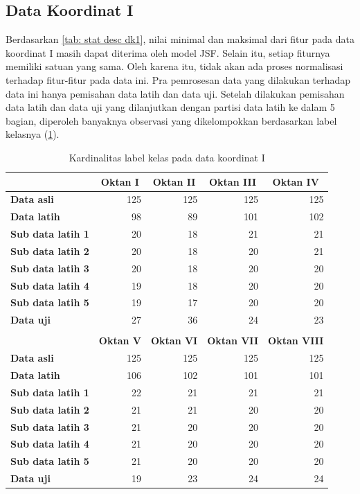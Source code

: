 \subsection{Data Koordinat I}
\noindent Berdasarkan \ref{tab: stat desc dk1}, nilai minimal dan maksimal dari fitur pada data koordinat I masih dapat diterima oleh model JSF. Selain itu, setiap fiturnya memiliki satuan yang sama. Oleh karena itu, tidak akan ada proses normalisasi terhadap fitur-fitur pada data ini. Pra pemrosesan data yang dilakukan terhadap data ini hanya pemisahan data latih dan data uji. Setelah dilakukan pemisahan data latih dan data uji yang dilanjutkan dengan partisi data latih ke dalam 5 bagian, diperoleh banyaknya observasi yang dikelompokkan berdasarkan label kelasnya (\ref{tab: label kelas dk1}).

\begin{table}[h!]
  \centering
  \caption{Kardinalitas label kelas pada data koordinat I}
    \begin{tabular}{lrrrr}
    \toprule
          & \multicolumn{1}{c}{\textbf{Oktan I}} & \multicolumn{1}{c}{\textbf{Oktan II}} & \multicolumn{1}{c}{\textbf{Oktan III}} & \multicolumn{1}{c}{\textbf{Oktan IV}} \\
    \midrule
    \textbf{Data asli} & 125   & 125   & 125   & 125 \\
    \textbf{Data latih} & 98    & 89    & 101   & 102 \\
    \textbf{Sub data latih 1} & 20    & 18    & 21    & 21 \\
    \textbf{Sub data latih 2} & 20    & 18    & 20    & 21 \\
    \textbf{Sub data latih 3} & 20    & 18    & 20    & 20 \\
    \textbf{Sub data latih 4} & 19    & 18    & 20    & 20 \\
    \textbf{Sub data latih 5} & 19    & 17    & 20    & 20 \\
    \textbf{Data uji} & 27    & 36    & 24    & 23 \\
    \midrule
          &       &       &       &  \\
    \midrule
          & \multicolumn{1}{c}{\textbf{Oktan V}} & \multicolumn{1}{c}{\textbf{Oktan VI}} & \multicolumn{1}{c}{\textbf{Oktan VII}} & \multicolumn{1}{c}{\textbf{Oktan VIII}} \\
    \midrule
    \textbf{Data asli} & 125   & 125   & 125   & 125 \\
    \textbf{Data latih} & 106   & 102   & 101   & 101 \\
    \textbf{Sub data latih 1} & 22    & 21    & 21    & 21 \\
    \textbf{Sub data latih 2} & 21    & 21    & 20    & 20 \\
    \textbf{Sub data latih 3} & 21    & 20    & 20    & 20 \\
    \textbf{Sub data latih 4} & 21    & 20    & 20    & 20 \\
    \textbf{Sub data latih 5} & 21    & 20    & 20    & 20 \\
    \textbf{Data uji} & 19    & 23    & 24    & 24 \\
    \bottomrule
    \end{tabular}%
  \label{tab: label kelas dk1}%
\end{table}%


